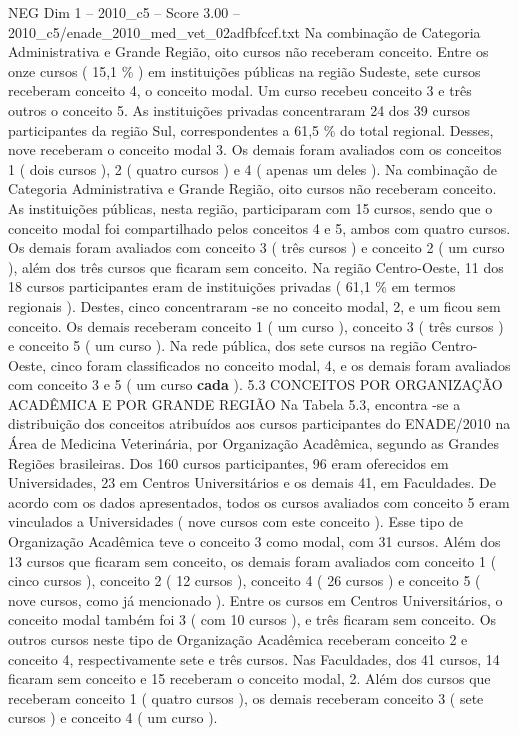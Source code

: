 \begin{textsample}{NEG Dim 1 – 2010\_c5 – Score 3.00 – 2010\_c5/enade\_2010\_med\_vet\_02adfbfccf.txt}
Na combinação de Categoria Administrativa e Grande Região, oito cursos não receberam conceito.
Entre os onze cursos ( 15,1 \% ) em instituições públicas na região Sudeste, sete cursos receberam conceito 4, o conceito modal.
Um curso recebeu conceito 3 e três outros o conceito 5.
As instituições privadas concentraram 24 dos 39 cursos participantes da região Sul, correspondentes a 61,5 \% do total regional.
Desses, nove receberam o conceito modal 3.
Os demais foram avaliados com os conceitos 1 ( dois cursos ), 2 ( quatro cursos ) e 4 ( apenas um deles ).
Na combinação de Categoria Administrativa e Grande Região, oito cursos não receberam conceito.
As instituições públicas, nesta região, participaram com 15 cursos, sendo que o conceito modal foi compartilhado pelos conceitos 4 e 5, ambos com quatro cursos.
Os demais foram avaliados com conceito 3 ( três cursos ) e conceito 2 ( um curso ), além dos três cursos que ficaram sem conceito.
Na região Centro-Oeste, 11 dos 18 cursos participantes eram de instituições privadas ( 61,1 \% em termos regionais ).
Destes, cinco concentraram -se no conceito modal, 2, e um ficou sem conceito.
Os demais receberam conceito 1 ( um curso ), conceito 3 ( três cursos ) e conceito 5 ( um curso ).
Na rede pública, dos sete cursos na região Centro-Oeste, cinco foram classificados no conceito modal, 4, e os demais foram avaliados com conceito 3 e 5 ( um curso \textbf{cada} ). 5.3 CONCEITOS POR ORGANIZAÇÃO ACADÊMICA E POR GRANDE REGIÃO Na Tabela 5.3, encontra -se a distribuição dos conceitos atribuídos aos cursos participantes do ENADE/2010 na Área de Medicina Veterinária, por Organização Acadêmica, segundo as Grandes Regiões brasileiras.
Dos 160 cursos participantes, 96 eram oferecidos em Universidades, 23 em Centros Universitários e os demais 41, em Faculdades.
De acordo com os dados apresentados, todos os cursos avaliados com conceito 5 eram vinculados a Universidades ( nove cursos com este conceito ).
Esse tipo de Organização Acadêmica teve o conceito 3 como modal, com 31 cursos.
Além dos 13 cursos que ficaram sem conceito, os demais foram avaliados com conceito 1 ( cinco cursos ), conceito 2 ( 12 cursos ), conceito 4 ( 26 cursos ) e conceito 5 ( nove cursos, como já mencionado ).
Entre os cursos em Centros Universitários, o conceito modal também foi 3 ( com 10 cursos ), e três ficaram sem conceito.
Os outros cursos neste tipo de Organização Acadêmica receberam conceito 2 e conceito 4, respectivamente sete e três cursos.
Nas Faculdades, dos 41 cursos, 14 ficaram sem conceito e 15 receberam o conceito modal, 2.
Além dos cursos que receberam conceito 1 ( quatro cursos ), os demais receberam conceito 3 ( sete cursos ) e conceito 4 ( um curso ).

\end{textsample}
